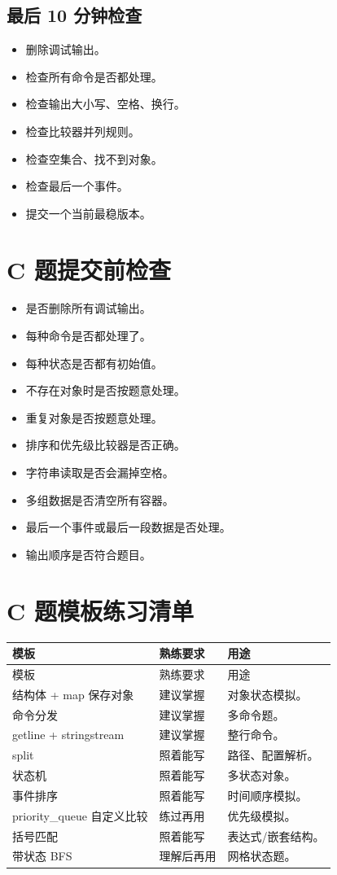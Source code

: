 \subsection{最后 10 分钟检查}

\begin{itemize}
  \item 删除调试输出。
  \item 检查所有命令是否都处理。
  \item 检查输出大小写、空格、换行。
  \item 检查比较器并列规则。
  \item 检查空集合、找不到对象。
  \item 检查最后一个事件。
  \item 提交一个当前最稳版本。
\end{itemize}

\section{C 题提交前检查}\label{sec:07-42}

\begin{itemize}
  \item 是否删除所有调试输出。
  \item 每种命令是否都处理了。
  \item 每种状态是否都有初始值。
  \item 不存在对象时是否按题意处理。
  \item 重复对象是否按题意处理。
  \item 排序和优先级比较器是否正确。
  \item 字符串读取是否会漏掉空格。
  \item 多组数据是否清空所有容器。
  \item 最后一个事件或最后一段数据是否处理。
  \item 输出顺序是否符合题目。
\end{itemize}

\section{C 题模板练习清单}\label{sec:07-43}

\begin{longtable}{p{4cm}p{4cm}p{6cm}}
\toprule
模板 & 熟练要求 & 用途 \\
\midrule
\endfirsthead
\toprule
模板 & 熟练要求 & 用途 \\
\midrule
\endhead
结构体 + map 保存对象 & 建议掌握 & 对象状态模拟。 \\
命令分发 & 建议掌握 & 多命令题。 \\
getline + stringstream & 建议掌握 & 整行命令。 \\
split & 照着能写 & 路径、配置解析。 \\
状态机 & 照着能写 & 多状态对象。 \\
事件排序 & 照着能写 & 时间顺序模拟。 \\
priority\_queue 自定义比较 & 练过再用 & 优先级模拟。 \\
括号匹配 & 照着能写 & 表达式/嵌套结构。 \\
带状态 BFS & 理解后再用 & 网格状态题。 \\
\bottomrule
\end{longtable}
